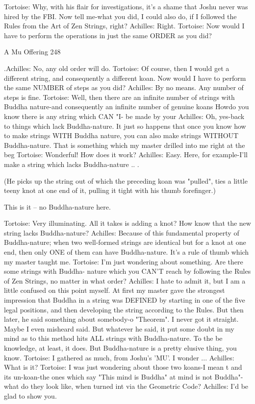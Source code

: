 Tortoise: Why, with his flair for investigations, it's a shame that Joshu
never was hired by the FBI. Now tell me-what you did, I could also
do, if I followed the Rules from the Art of Zen Strings, right?
Achilles: Right.
Tortoise: Now would I have to perform the operations in just the same ORDER as you
    did?



A Mu Offering                                                                        248

.Achilles: No, any old order will do.
Tortoise: Of course, then I would get a different string, and consequently a different
   koan. Now would I have to perform the same NUMBER of steps as you did?
Achilles: By no means. Any number of steps is fine.
Tortoise: Well, then there are an infinite number of strings with Buddha nature-and
   consequently an infinite number of genuine koans Howdo you know there is any
   string which CAN "I- be made by your Achilles: Oh, yes-back to things which lack
   Buddha-nature. It just so happens that once you know how to make strings WITH
   Buddha nature, you can also make strings WITHOUT Buddha-nature. That is
   something which my master drilled into me right at the beg Tortoise: Wonderful!
   How does it work?
Achilles: Easy. Here, for example-I'll make a string which lacks Buddha-nature .. .

   (He picks up the string out of which the preceding koan was "pulled", ties a little
   teeny knot at one end of it, pulling it tight with his thumb forefinger.)

This is it -- no Buddha-nature here.

Tortoise: Very illuminating. All it takes is adding a knot? How know that the new string
   lacks Buddha-nature?
Achilles: Because of this fundamental property of Buddha-nature; when two well-formed
   strings are identical but for a knot at one end, then only ONE of them can have
   Buddha-nature. It's a rule of thumb which my master taught me.
Tortoise: I'm just wondering about something. Are there some strings with Buddha-
   nature which you CAN'T reach by following the Rules of Zen Strings, no matter in
   what order?
Achilles: I hate to admit it, but I am a little confused on this point myself. At first my
   master gave the strongest impression that Buddha in a string was DEFINED by
   starting in one of the five legal positions, and then developing the string according to
   the Rules. But then later, he said something about somebody-o "Theorem". I never
   got it straight. Maybe I even misheard said. But whatever he said, it put some doubt in
   my mind as to this method hits ALL strings with Buddha-nature. To the be
   knowledge, at least, it does. But Buddha-nature is a pretty elusive thing, you know.
Tortoise: I gathered as much, from Joshu's 'MU'. I wonder ...
Achilles: What is it?
Tortoise: I was just wondering about those two koans-I mean t and its un-koan-the ones
   which say "This mind is Buddha" at mind is not Buddha"-what do they look like,
   when turned int via the Geometric Code?
Achilles: I'd be glad to show you.




